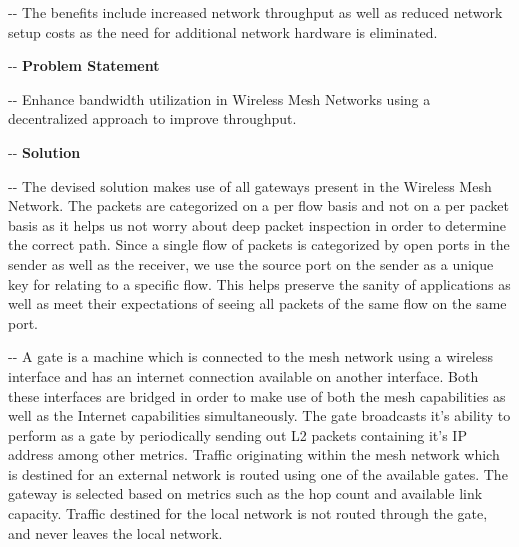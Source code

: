 \documentclass[12pt]{article}
\makeatletter
\newenvironment{indentation}[3]%
	{\par\setlength{\parindent}{#3}
	\setlength{\leftmargin}{#1}       \setlength{\rightmargin}{#1}%
	\advance\linewidth -\leftmargin       \advance\linewidth -\rightmargin%
	\advance\@totalleftmargin\leftmargin  \@setpar{{\@@par}}%
	\parshape 1\@totalleftmargin \linewidth\ignorespaces}{\par}%
\makeatother
\begin{document}
\begin{indentation}{0pt}{0pt}{0pt}
{\normalsize \hspace{1cm}The benefits include increased network throughput as well as reduced network setup costs as the need for additional network hardware is eliminated.}
\end{indentation}

\begin{indentation}{0pt}{0pt}{0pt}
\vspace{1cm}
\textbf{{{\Large Problem Statement}}}
\end{indentation}
\vspace{0.5cm}

\begin{indentation}{0pt}{0pt}{0pt}
{\normalsize \hspace{1cm} Enhance bandwidth utilization in Wireless Mesh Networks using a decentralized approach to improve throughput.}
\end{indentation}

\begin{indentation}{0pt}{0pt}{0pt}
  \vspace{1cm}
 \pagebreak
\textbf{{{\Large Solution}}}
\end{indentation}
\vspace{0.5cm}
\begin{indentation}{0pt}{0pt}{0pt}
{\normalsize \hspace{1cm} The devised solution makes use of all gateways present in the Wireless Mesh Network. The packets are categorized on a per flow basis and not on a per packet basis as it helps us not worry about deep packet inspection in order to determine the correct path. Since a single flow of packets is categorized by open ports in the sender as well as the receiver, we use the source port on the sender as a unique key for relating to a specific flow. This helps preserve the sanity of applications as well as meet their expectations of seeing all packets of the same flow on the same port.}
\end{indentation}


\begin{indentation}{0pt}{0pt}{0pt}
  {\normalsize \hspace{1cm} A gate is a machine which is connected to the mesh network using a wireless interface and has an internet connection available on another interface. Both these interfaces are bridged in order to make use of both the mesh capabilities as well as the Internet capabilities simultaneously. The gate broadcasts it's ability to perform as a gate by periodically sending out L2 packets containing it's IP address among other metrics. Traffic originating within the mesh network which is destined for an external network is routed using one of the available gates. The gateway is selected based on metrics such as the hop count and available link capacity. Traffic destined for the local network is not routed through the gate, and never leaves the local network.} 
\end{indentation}
\end{document}

